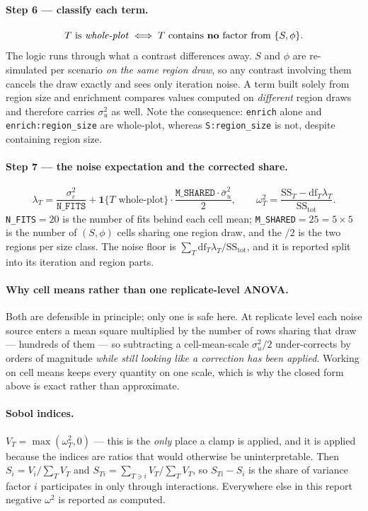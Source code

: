 \documentclass[11pt,a4paper]{article}
\begin{document}
\paragraph{Step 6 --- classify each term.}
\[
T \text{ is \emph{whole-plot}} \iff T \text{ contains \textbf{no} factor from } \{S,\phi\}.
\]
The logic runs through what a contrast differences away. $S$ and $\phi$ are
re-simulated per scenario \emph{on the same region draw}, so any contrast
involving them cancels the draw exactly and sees only iteration noise. A term
built solely from region size and enrichment compares values computed on
\emph{different} region draws and therefore carries $\sigma^2_u$ as well. Note
the consequence: \texttt{enrich} alone and
\texttt{enrich:region\_size} are whole-plot, whereas \texttt{S:region\_size} is
not, despite containing region size.

\paragraph{Step 7 --- the noise expectation and the corrected share.}
\[
\lambda_T=\frac{\sigma^2_\varepsilon}{\texttt{N\_FITS}}
+\mathbf{1}\{T\text{ whole-plot}\}\cdot\frac{\texttt{M\_SHARED}\cdot\bar\sigma^2_u}{2},
\qquad
\omega^2_T=\frac{\mathrm{SS}_T-\mathrm{df}_T\lambda_T}{\mathrm{SS}_{\text{tot}}} .
\]
\texttt{N\_FITS}$=20$ is the number of fits behind each cell mean;
\texttt{M\_SHARED}$=25=5\times5$ is the number of $(S,\phi)$ cells sharing one
region draw, and the $/2$ is the two regions per size class. The noise floor is
$\sum_T \mathrm{df}_T\lambda_T/\mathrm{SS}_{\text{tot}}$, and it is reported
split into its iteration and region parts.

\paragraph{Why cell means rather than one replicate-level ANOVA.}
Both are defensible in principle; only one is safe here. At replicate level each
noise source enters a mean square multiplied by the number of rows sharing that
draw --- hundreds of them --- so subtracting a cell-mean-scale $\sigma^2_u/2$
under-corrects by orders of magnitude \emph{while still looking like a
correction has been applied}. Working on cell means keeps every quantity on one
scale, which is why the closed form above is exact rather than approximate.

\paragraph{Sobol indices.}
$V_T=\max(\omega^2_T,0)$ --- this is the \emph{only} place a clamp is applied,
and it is applied because the indices are ratios that would otherwise be
uninterpretable. Then
$S_i = V_i/\sum_T V_T$ and $S_{Ti}=\sum_{T\ni i}V_T/\sum_T V_T$, so
$S_{Ti}-S_i$ is the share of variance factor $i$ participates in only through
interactions. Everywhere else in this report negative $\omega^2$ is reported as
computed.
\end{document}
